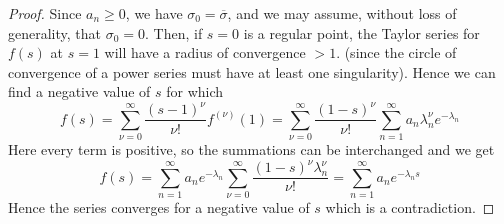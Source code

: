 \begin{proof}
Since $a_n \geq 0$, we have $\sigma_0 = \overline{\sigma}$, and we may
assume, without loss of generality, that $\sigma_0=0$. Then, if $s=0$
is a regular point, the Taylor series for $f(s)$ at $s =1$ will have a
radius of convergence $>1$. (since the circle of convergence of a
power series must have at least one singularity). Hence we can find a
negative value of $s$ for which
$$
f(s) = \sum\limits^\infty_{\nu=0} \frac{(s-1)^\nu}{\nu!} f^{(\nu)} (1)
= \sum\limits^\infty_{\nu=0} \frac{(1-s)^{\nu}}{\nu !}
\sum\limits^{\infty}_{n=1} a_n \lambda^{\nu}_n e^{-\lambda_n} 
$$
Here every term is positive, so the summations can be interchanged and 
\pageoriginale we get
$$
f(s) = \sum\limits^\infty_{n=1} a_n e^{-\lambda_n}
\sum\limits^\infty_{\nu=0} \frac{(1-s)^\nu \lambda^\nu_n}{\nu!} =
\sum\limits^\infty_{n=1} a_n e^{-\lambda_ns}
$$
Hence the series converges for a negative value of $s$ which is a
contradiction. 
\end{proof}

